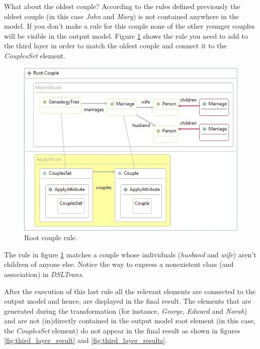 What about the oldest couple? According to the rules defined previously the
oldest couple (in this case \emph{John} and \emph{Mary}) is not contained
anywhere in the model. If you don't make a rule for this couple none of the
other younger couples will be visible in the output model. Figure
\ref{fig:root_couple_rule} shows the rule you need to add to the third layer in
order to match the oldest couple and connect it to the \emph{CouplesSet}
element.

\begin{figure}[h]
\begin{center}
  \includegraphics[scale=0.7]{imgs/root_couple_rule.jpg}
  \caption{Root couple rule.}
  \label{fig:root_couple_rule}
\end{center}
\end{figure}

The rule in figure \ref{fig:root_couple_rule} matches a couple whose individuals
(\emph{husband} and \emph{wife}) aren't children of anyone else. Notice the way
to express a nonexistent class (and association) in \emph{DSLTrans}.

After the execution of this last rule all the relevant elements are connected to
the output model and hence, are displayed in the final result. The elements that
are generated during the transformation (for instance, \emph{George},
\emph{Edward} and \emph{Norah}) and are not (in)directly contained in the output
model root element (in this case, the \emph{CouplesSet} element) do not appear
in the final result as shown in figures \ref{fig:third_layer_result} and
\ref{fig:third_layer_results}.

